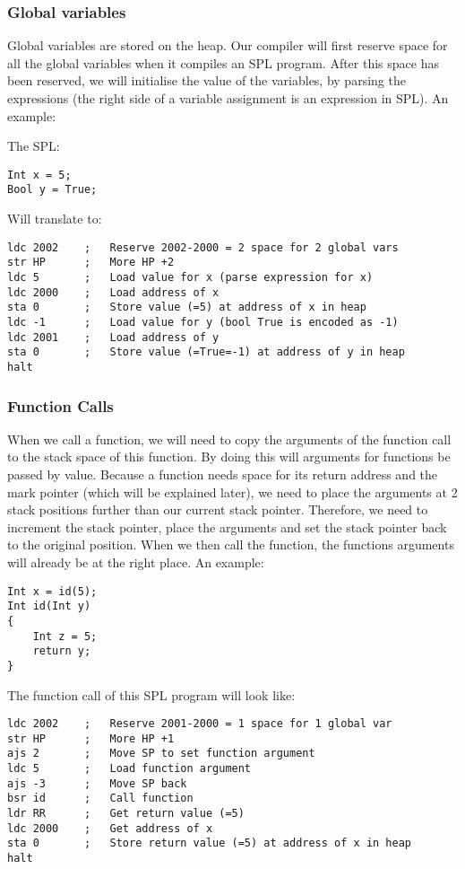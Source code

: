 \documentclass[a4paper]{article}
\begin{document}
\subsubsection{Global variables}
Global variables are stored on the heap. Our compiler will first reserve space for all the global variables when it compiles an SPL program. After this space has been reserved, we will initialise the value of the variables, by parsing the expressions (the right side of a variable assignment is an expression in SPL). An example:

The SPL:
\begin{lstlisting}
Int x = 5;
Bool y = True;
\end{lstlisting}
Will translate to:
\begin{lstlisting}
ldc 2002	;	Reserve 2002-2000 = 2 space for 2 global vars
str HP		;	More HP +2	
ldc 5		; 	Load value for x (parse expression for x)
ldc 2000	;	Load address of x
sta 0		;	Store value (=5) at address of x in heap
ldc -1		;	Load value for y (bool True is encoded as -1)
ldc 2001	;	Load address of y
sta 0		;	Store value (=True=-1) at address of y in heap
halt		
\end{lstlisting}

\subsubsection{Function Calls}
When we call a function, we will need to copy the arguments of the function call to the stack space of this function. By doing this will arguments for functions be passed by value. Because a function needs space for its return address and the mark pointer (which will be explained later), we need to place the arguments at 2 stack positions further than our current stack pointer. Therefore, we need to increment the stack pointer, place the arguments and set the stack pointer back to the original position. When we then call the function, the functions arguments will already be at the right place. An example:

\begin{lstlisting}
Int x = id(5);
Int id(Int y)
{
	Int z = 5;
	return y;
}
\end{lstlisting}
The function call of this SPL program will look like:
\begin{lstlisting}
ldc 2002	;	Reserve 2001-2000 = 1 space for 1 global var
str HP		;	More HP +1
ajs 2		;	Move SP to set function argument
ldc 5		;	Load function argument
ajs -3		;	Move SP back
bsr id		;	Call function
ldr RR		;	Get return value (=5)
ldc 2000	;	Get address of x
sta 0		;	Store return value (=5) at address of x in heap
halt
\end{lstlisting}
\end{document}
